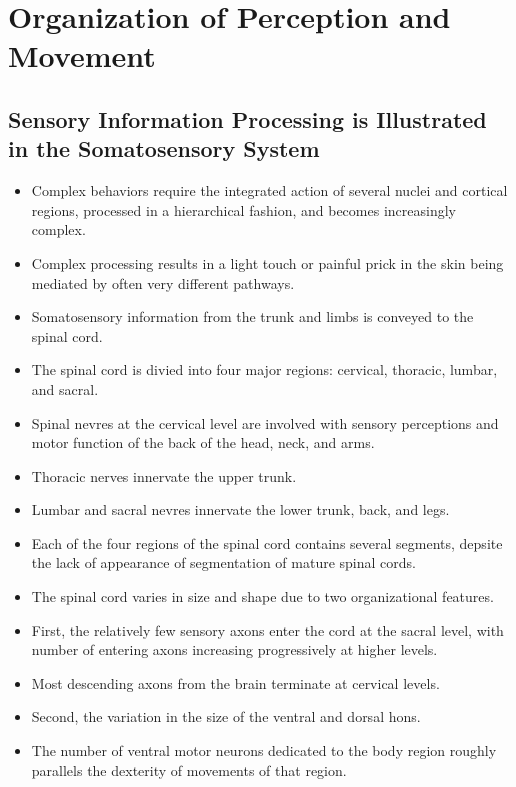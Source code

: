 \documentclass[12pt,a4paper]{article}
\begin{document}
\clearpage
\section{Organization of Perception and Movement}
\subsection{Sensory Information Processing is Illustrated in the Somatosensory System}
\begin{itemize}
    \item Complex behaviors require the integrated action of several nuclei and cortical regions, processed in a hierarchical fashion, and becomes increasingly complex.
    \item Complex processing results in a light touch or painful prick in the skin being mediated by often very different pathways.
    \item Somatosensory information from the trunk and limbs is conveyed to the spinal cord.
    \item The spinal cord is divied into four major regions: cervical, thoracic, lumbar, and sacral.
    \item Spinal nevres at the cervical level are involved with sensory perceptions and motor function of the back of the head, neck, and arms.
    \item Thoracic nerves innervate the upper trunk.
    \item Lumbar and sacral nevres innervate the lower trunk, back, and legs.
    \item Each of the four regions of the spinal cord contains several segments, depsite the lack of appearance of segmentation of mature spinal cords.  
    \item The spinal cord varies in size and shape due to two organizational features.
    \item First, the relatively few sensory axons enter the cord at the sacral level, with number of entering axons increasing progressively at higher levels.
    \item Most descending axons from the brain terminate at cervical levels.
    \item Second, the variation in the size of the ventral and dorsal hons.
    \item The number of ventral motor neurons dedicated to the body region roughly parallels the dexterity of movements of that region.

\end{itemize}
\end{document}
